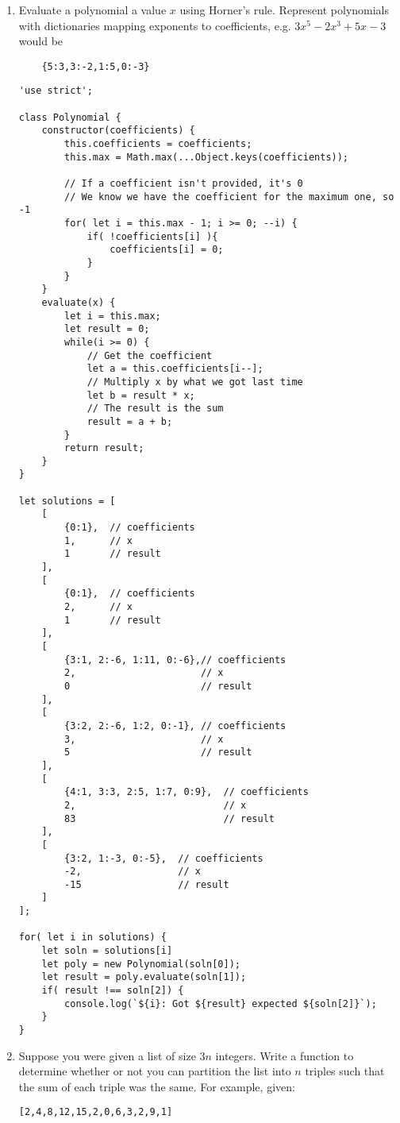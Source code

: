 \documentclass[a4paper,12pt]{article}
\begin{document}
\begin{enumerate}
    \item Evaluate a polynomial a value $x$ using Horner's rule. Represent polynomials with dictionaries mapping exponents to coefficients, e.g. $3x^5−2x^3+5x−3$ would be
    \begin{verbatim}
    {5:3,3:-2,1:5,0:-3}
    \end{verbatim}

\begin{verbatim}
'use strict';

class Polynomial {
    constructor(coefficients) {
        this.coefficients = coefficients;
        this.max = Math.max(...Object.keys(coefficients));

        // If a coefficient isn't provided, it's 0
        // We know we have the coefficient for the maximum one, so -1
        for( let i = this.max - 1; i >= 0; --i) {
            if( !coefficients[i] ){
                coefficients[i] = 0;
            }
        }
    }
    evaluate(x) {
        let i = this.max;
        let result = 0;
        while(i >= 0) {
            // Get the coefficient
            let a = this.coefficients[i--];
            // Multiply x by what we got last time
            let b = result * x;
            // The result is the sum
            result = a + b;
        }
        return result;
    }
}

let solutions = [
    [
        {0:1},  // coefficients
        1,      // x
        1       // result
    ],
    [
        {0:1},  // coefficients
        2,      // x
        1       // result
    ],
    [
        {3:1, 2:-6, 1:11, 0:-6},// coefficients
        2,                      // x
        0                       // result
    ],
    [
        {3:2, 2:-6, 1:2, 0:-1}, // coefficients
        3,                      // x
        5                       // result
    ],
    [
        {4:1, 3:3, 2:5, 1:7, 0:9},  // coefficients
        2,                          // x
        83                          // result
    ],
    [
        {3:2, 1:-3, 0:-5},  // coefficients
        -2,                 // x
        -15                 // result
    ]
];

for( let i in solutions) {
    let soln = solutions[i]
    let poly = new Polynomial(soln[0]);
    let result = poly.evaluate(soln[1]);
    if( result !== soln[2]) {
        console.log(`${i}: Got ${result} expected ${soln[2]}`);
    }
}
\end{verbatim}

\item Suppose you were given a list of size $3n$ integers. Write a function to determine whether or not you can partition the list into $n$ triples such that the sum of each triple was the same. For example, given:
\begin{verbatim}
[2,4,8,12,15,2,0,6,3,2,9,1]
\end{verbatim}


\end{enumerate}
\end{document}
